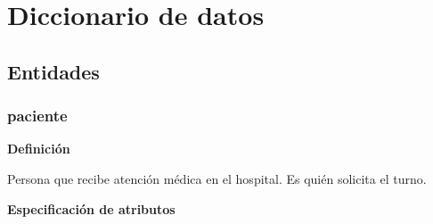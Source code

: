 \documentclass[a4paper,11pt]{article}
\begin{document}
\FloatBarrier


%
%
%


\section{\textbf{Diccionario de datos}}

\subsection{\textbf{Entidades}}

\subsubsection{\textbf{paciente}}

\textbf{Definición}

Persona que recibe atención médica en el hospital. Es quién solicita el turno. 

\textbf{Especificación de atributos}
\end{document}

